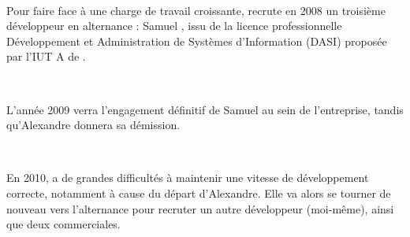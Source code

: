 ~

Pour faire face à une charge de travail croissante, \solulog{} recrute en 2008 un troisième développeur en alternance : Samuel , issu de la licence professionnelle Développement et Administration de Systèmes d'Information (DASI) proposée par l'IUT A de .

~

L'année 2009 verra l'engagement définitif de Samuel au sein de l'entreprise, tandis qu'Alexandre donnera sa démission.

~

En 2010, \solulog{} a de grandes difficultés à maintenir une vitesse de développement correcte, notamment à cause du départ d'Alexandre. Elle va alors se tourner de nouveau vers l'alternance pour recruter un autre développeur (moi-même), ainsi que deux commerciales.